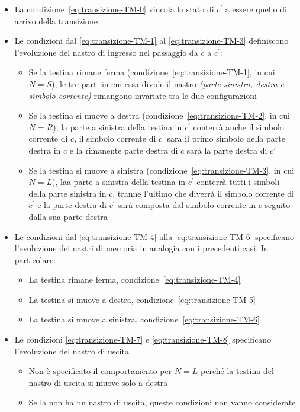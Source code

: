 \documentclass[italian, 10pt]{article}
\begin{document}
\begin{itemize}
  \item La condizione~\ref{eq:transizione-TM-0} vincola lo stato di \(c^\prime\) a essere quello di arrivo della transizione
  \item Le condizioni dal \ref{eq:transizione-TM-1} al \ref{eq:transizione-TM-3} definiscono l'evoluzione del nastro di ingresso nel passaggio da \(c\) a \(c^\prime\):
        \begin{itemize}
          \item Se la testina rimane ferma (condizione~\ref{eq:transizione-TM-1}, in cui \(N=S\)), le tre parti in cui essa divide il nastro \textit{(parte sinistra, destra e simbolo corrente)} rimangono invariate tra le due configurazioni
          \item Se la testina si muove a destra (condizione~\ref{eq:transizione-TM-2}, in cui \(N=R\)), la parte a sinistra della testina in \(c^\prime\) conterrà anche il simbolo corrente di \(c\), il simbolo corrente di \(c^\prime\) sara il primo simbolo della parte destra in \(c\) e la rimanente parte destra di \(c\) sarà la parte destra di \(c'\)
          \item Se la testina si muove a sinistra (condizione~\ref{eq:transizione-TM-3}, in cui \(N=L\)), laa parte a sinistra della testina in \(c^\prime\) conterrà tutti i simboli della parte sinistra in \(c\), tranne l'ultimo che diverrà il simbolo corrente di \(c^\prime\) e la parte destra di \(c^\prime\) sarà composta dal simbolo corrente in \(c\) seguito dalla sua parte destra
        \end{itemize}
  \item Le condizioni dal \ref{eq:transizione-TM-4} alla \ref{eq:transizione-TM-6} specificano l'evoluzione dei nastri di memoria in analogia con i precedenti casi. In particolare:
        \begin{itemize}
          \item La testina rimane ferma, condizione~\ref{eq:transizione-TM-4}
          \item La testina si muove a destra, condizione~\ref{eq:transizione-TM-5}
          \item La testina si muove a sinistra, condizione~\ref{eq:transizione-TM-6}
        \end{itemize}
  \item Le condizioni \ref{eq:transizione-TM-7} e \ref{eq:transizione-TM-8} specificano l'evoluzione del nastro di uscita
        \begin{itemize}
          \item Non è specificato il comportamento per \(N=L\) perché la testina del nastro di uscita si muove solo a destra
          \item Se la \TM non ha un nastro di uscita, queste condizioni non vanno considerate
        \end{itemize}
\end{itemize}
\end{document}
